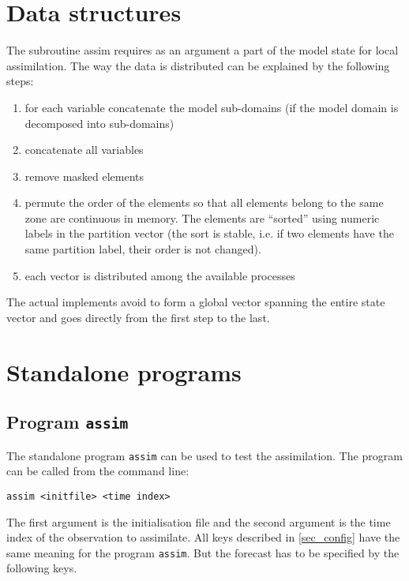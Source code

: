 \documentclass[a4paper,12pt]{article}
\newcommand{\code}{\texttt}
\begin{document}
\section{Data structures}

The subroutine assim requires as an argument a part of the model state for local assimilation. The way the data is distributed can be explained by the following steps:

\begin{enumerate}
\item for each variable concatenate the model sub-domains (if the model domain is decomposed into sub-domains)
\item concatenate all variables
\item remove masked elements
\item permute the order of the elements so that all elements belong to the same zone are continuous in memory. The elements are ``sorted'' using numeric labels in the partition vector (the sort is stable, i.e. if two elements have the same partition label, their order is not changed).
\item each vector is distributed among the available processes
\end{enumerate}

The actual implements avoid to form a global vector spanning the entire state vector and goes directly from the first step to the last.

\section{Standalone programs}\label{sec_standalone}

\subsection{Program \code{assim}}\label{prog_assim}

The standalone program \code{assim} can be used to test the assimilation. The program can be called from the command line:

\begin{verbatim}
assim <initfile> <time index>
\end{verbatim}

The first argument is the initialisation file and the second argument is the time index of the observation to assimilate. All keys described in \ref{sec_config} have the same meaning for the program \code{assim}. But the forecast has to be specified by the following keys.
\end{document}
